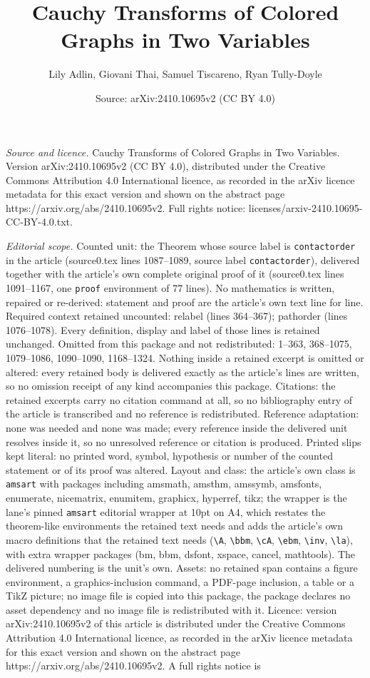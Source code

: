 \documentclass[10pt,a4paper]{amsart}
\title[Cauchy Transforms of Colored Graphs in Two Variables]{Cauchy Transforms of Colored Graphs in Two Variables}
\author{Lily Adlin, Giovani Thai, Samuel Tiscareno, Ryan Tully-Doyle}
\date{Source: arXiv:2410.10695v2 (CC BY 4.0)}
\begin{document}
\maketitle

\noindent\emph{Source and licence.} Cauchy Transforms of Colored Graphs in Two Variables. Version arXiv:2410.10695v2 (CC BY 4.0), distributed under the Creative Commons Attribution 4.0 International licence, as recorded in the arXiv licence metadata for this exact version and shown on the abstract page https://arxiv.org/abs/2410.10695v2. Full rights notice: licenses/arxiv-2410.10695-CC-BY-4.0.txt.\par\smallskip

\noindent\textit{Editorial scope.} Counted unit: the Theorem whose source label is \texttt{contactorder} in the article (source0.tex lines 1087--1089, source label \texttt{contactorder}), delivered together with the article's own complete original proof of it (source0.tex lines 1091--1167, one \texttt{proof} environment of 77 lines). No mathematics is written, repaired or re-derived: statement and proof are the article's own text line for line. Required context retained uncounted: relabel (lines 364--367); pathorder (lines 1076--1078). Every definition, display and label of those lines is retained unchanged. Omitted from this package and not redistributed: 1--363, 368--1075, 1079--1086, 1090--1090, 1168--1324. Nothing inside a retained excerpt is omitted or altered: every retained body is delivered exactly as the article's lines are written, so no omission receipt of any kind accompanies this package. Citations: the retained excerpts carry no citation command at all, so no bibliography entry of the article is transcribed and no reference is redistributed. Reference adaptation: none was needed and none was made; every reference inside the delivered unit resolves inside it, so no unresolved reference or citation is produced. Printed slips kept literal: no printed word, symbol, hypothesis or number of the counted statement or of its proof was altered. Layout and class: the article's own class is \texttt{amsart} with packages including amsmath, amsthm, amssymb, amsfonts, enumerate, nicematrix, enumitem, graphicx, hyperref, tikz; the wrapper is the lane's pinned \texttt{amsart} editorial wrapper at 10pt on A4, which restates the theorem-like environments the retained text needs and adds the article's own macro definitions that the retained text needs (\texttt{\textbackslash A}, \texttt{\textbackslash bbm}, \texttt{\textbackslash cA}, \texttt{\textbackslash ebm}, \texttt{\textbackslash inv}, \texttt{\textbackslash la}), with extra wrapper packages (bm, bbm, dsfont, xspace, cancel, mathtools). The delivered numbering is the unit's own. Assets: no retained span contains a figure environment, a graphics-inclusion command, a PDF-page inclusion, a table or a TikZ picture; no image file is copied into this package, the package declares no asset dependency and no image file is redistributed with it. Licence: version arXiv:2410.10695v2 of this article is distributed under the Creative Commons Attribution 4.0 International licence, as recorded in the arXiv licence metadata for this exact version and shown on the abstract page https://arxiv.org/abs/2410.10695v2. A full rights notice is 
\end{document}
